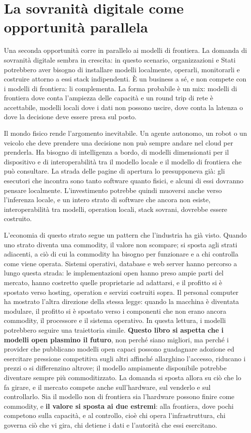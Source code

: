 \documentclass[10pt,oneside,openany]{book}
\begin{document}
\section{La sovranità digitale come opportunità parallela}\label{sec:sovereignty}

Una seconda opportunità corre in parallelo ai modelli di frontiera. La domanda di sovranità digitale sembra in crescita: in questo scenario, organizzazioni e Stati potrebbero aver bisogno di installare modelli localmente, operarli, monitorarli e costruire attorno a essi stack indipendenti. È un business a sé, e non compete con i modelli di frontiera: li complementa. La forma probabile è un mix: modelli di frontiera dove conta l'ampiezza delle capacità e un round trip di rete è accettabile, modelli locali dove i dati non possono uscire, dove conta la latenza o dove la decisione deve essere presa sul posto.

Il mondo fisico rende l'argomento inevitabile. Un agente autonomo, un robot o un veicolo che deve prendere una decisione non può sempre andare nel cloud per prenderla. Ha bisogno di intelligenza a bordo, di modelli dimensionati per il dispositivo e di interoperabilità tra il modello locale e il modello di frontiera che può consultare. La strada delle pagine di apertura lo presupponeva già: gli esecutori che incontra sono tanto software quanto fisici, e alcuni di essi dovranno pensare localmente. L'investimento potrebbe quindi muoversi anche verso l'inferenza locale, e un intero strato di software che ancora non esiste, interoperabilità tra modelli, operation locali, stack sovrani, dovrebbe essere costruito.

L'economia di questo strato segue un pattern che l'industria ha già visto. Quando uno strato diventa una commodity, il valore non scompare; si sposta agli strati adiacenti, a ciò di cui la commodity ha bisogno per funzionare e a chi controlla come viene operata. Sistemi operativi, database e web server hanno percorso a lungo questa strada: le implementazioni open hanno preso ampie parti del mercato, hanno costretto quelle proprietarie ad adattarsi, e il profitto si è spostato verso hosting, operation e servizi costruiti sopra. Il personal computer ha mostrato l'altra direzione della stessa legge: quando la macchina è diventata modulare, il profitto si è spostato verso i componenti che non erano ancora commodity, il processore e il sistema operativo. In questa lettura, i modelli potrebbero seguire una traiettoria simile. \textbf{Questo libro si aspetta che i modelli open plasmino il futuro}, non perché siano migliori, ma perché i provider che pubblicano modelli open capaci possono guadagnare adozione ed esercitare pressione competitiva sugli altri affinché allarghino l'accesso, riducano i prezzi o si differenzino altrove; il modello ampiamente disponibile potrebbe diventare sempre più commoditizzato. La domanda si sposta allora su ciò che lo fa girare, e il mercato compete anche sull'hardware, sul venderlo e sul controllarlo. Sia il modello non di frontiera sia l'hardware possono finire come commodity, e \textbf{il valore si sposta ai due estremi}: alla frontiera, dove pochi competono sulla capacità, e al controllo, cioè chi opera l'infrastruttura, chi governa ciò che vi gira, chi detiene i dati e l'autorità che essi esercitano.
\end{document}
